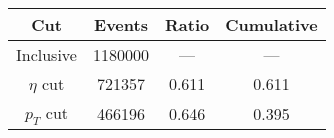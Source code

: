 \begin{tabular}{|c||c|c|c|}
\hline
Cut & Events & Ratio & Cumulative \\\hline
Inclusive & 1180000 & — & — \\
$\eta$ cut & 721357 & 0.611 & 0.611 \\
$p_T$ cut & 466196 & 0.646 & 0.395 \\
\hline
\end{tabular}
